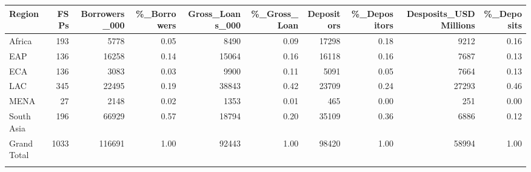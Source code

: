 \documentclass[a4paper, nobind]{templates/ociamthesis}
\begin{document}
\newpage

\begin{landscape}\begin{table}
\centering\begingroup\fontsize{8}{10}\selectfont

\begin{tabular}{lrrrrrrrrr}
\toprule{}
Region & FSPs & Borrowers\_000 & \%\_Borrowers & Gross\_Loans\_000 & \%\_Gross\_Loan & Depositors & \%\_Depositors & Desposits\_USDMillions & \%\_Deposits\\
\midrule{}
Africa & 193 & 5778 & 0.05 & 8490 & 0.09 & 17298 & 0.18 & 9212 & 0.16\\
EAP & 136 & 16258 & 0.14 & 15064 & 0.16 & 16118 & 0.16 & 7687 & 0.13\\
ECA & 136 & 3083 & 0.03 & 9900 & 0.11 & 5091 & 0.05 & 7664 & 0.13\\
LAC & 345 & 22495 & 0.19 & 38843 & 0.42 & 23709 & 0.24 & 27293 & 0.46\\
MENA & 27 & 2148 & 0.02 & 1353 & 0.01 & 465 & 0.00 & 251 & 0.00\\
\addlinespace
South Asia & 196 & 66929 & 0.57 & 18794 & 0.20 & 35109 & 0.36 & 6886 & 0.12\\
Grand Total & 1033 & 116691 & 1.00 & 92443 & 1.00 & 98420 & 1.00 & 58994 & 1.00\\
\bottomrule{}
\end{tabular}
\endgroup{}
\end{table}
\end{landscape}

\newpage
\end{document}
